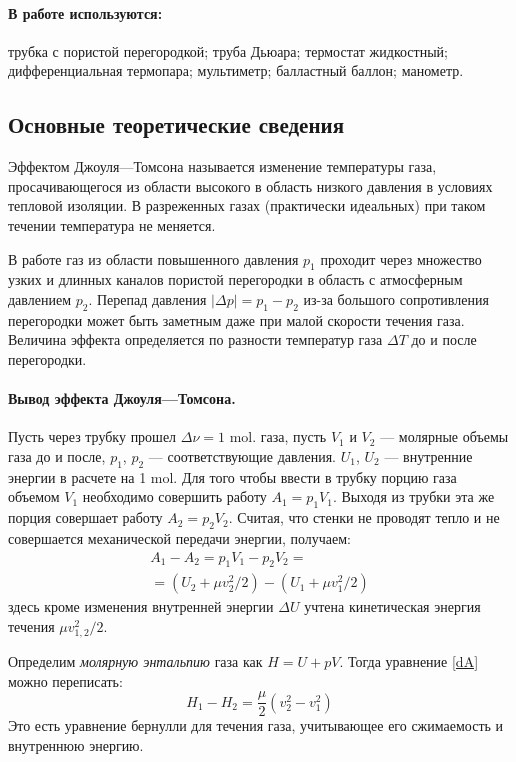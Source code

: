 \documentclass[a4paper,12pt]{report}
\begin{document}
        \paragraph*{В работе используются:} трубка с пористой перегородкой; труба Дьюара; термостат жидкостный; дифференциальная термопара; мультиметр; балластный баллон; манометр.
    \vspace{0.5cm}
    \begin{multicols}{2}
    \section{Основные теоретические сведения}
        Эффектом Джоуля---Томсона называется изменение температуры газа, просачивающегося из области высокого в область низкого давления в условиях тепловой изоляции. В разреженных газах (практически идеальных) при таком течении температура не меняется.

        В работе газ из области повышенного давления $p_1$ проходит через множество узких и длинных каналов пористой перегородки в область с атмосферным давлением $p_2$. Перепад давления $|\Delta p|=p_1-p_2$ из-за большого сопротивления перегородки может быть заметным даже при малой скорости течения газа. Величина эффекта определяется по разности температур газа $\Delta T$ до и после перегородки.

        \paragraph*{Вывод эффекта Джоуля---Томсона.} Пусть через трубку прошел $\Delta \nu = 1$ mol. газа, пусть $V_1$ и $V_2$ --- молярные объемы газа до и после, $p_1$, $p_2$ --- соответствующие давления. $U_1$, $U_2$ --- внутренние энергии в расчете на 1 mol. Для того чтобы ввести в трубку порцию газа объемом $V_1$ необходимо совершить работу $A_1=p_1V_1$. Выходя из трубки эта же порция совершает работу $A_2=p_2V_2$. Считая, что стенки не проводят тепло и не совершается механической передачи энергии, получаем:
        \begin{align}
            A_1-A_2=p_1V_1-p_2V_2=\nonumber\\
            =(U_2+\mu v_2^2/2)-(U_1+\mu v_1^2/2)
            \label{dA}
        \end{align}
        здесь кроме изменения внутренней энергии $\Delta U$ учтена кинетическая энергия течения $\mu v_{1,2}^2/2$.

        Определим \emph{молярную энтальпию} газа как $H=U+pV$. Тогда уравнение \eqref{dA} можно переписать:
        \begin{equation}
            H_1-H_2=\frac{\mu}{2}(v_2^2-v_1^2)
            \label{dH}
        \end{equation}
        Это есть уравнение бернулли для течения газа, учитывающее его сжимаемость и внутреннюю энергию.
        

\end{multicols}
\end{document}
